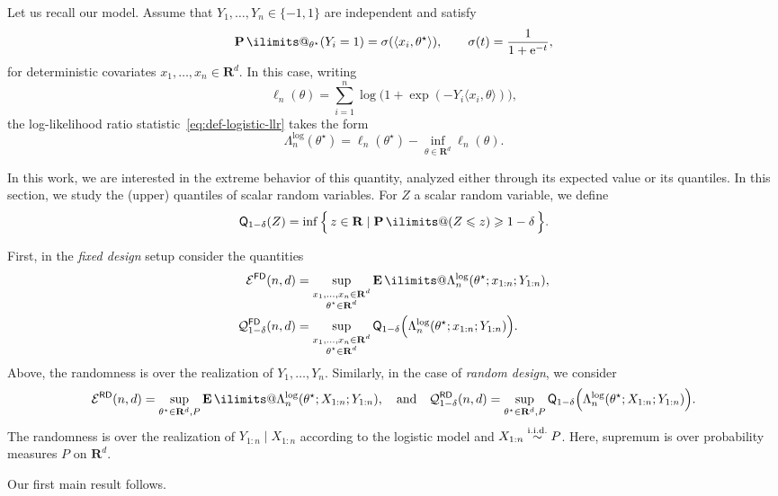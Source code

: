 \documentclass[11pt, letterpaper, hidelinks]{article}
\makeatletter
\newcommand{\R}{\mathbf R}
\newcommand{\cE}{\mathcal{E}}
\newcommand{\cQ}{\mathcal{Q}}
\newcommand{\e}{\mathrm{e}}
\newcommand{\1}{\mathbf 1}
\renewcommand{\leq}{\leqslant}
\renewcommand{\geq}{\geqslant}
\newcommand{\iid}{\textnormal{i.i.d.}}
\newcommand{\simiid}{\stackrel{\iid}{\sim}}
\newcommand{\E}{\operatorname*{\mathbf{E}}\ilimits@}
\renewcommand{\P}{\operatorname*{\mathbf{P}}\ilimits@}
\theoremstyle{plain}
\theoremstyle{definition}
\newcommand{\thetastar}{\theta^\star}
\newcommand{\defn}{=}
\newcommand{\Quant}[1]{\mathsf{Q}_{#1}}
\newcommand{\FD}{\mathsf{FD}}
\newcommand{\RD}{\mathsf{RD}}
\newcommand{\WorstCaseFixedDesign}[2]{\cE^\FD(#1,#2)}
\newcommand{\WorstCaseRandomDesign}[2]{\cE^\RD(#1,#2)}
\newcommand{\WorstCaseFixedDesignQuant}[3]{\cQ_{#1}^\FD(#2,#3)}
\newcommand{\WorstCaseRandomDesignQuant}[3]{\cQ_{#1}^\RD(#2,#3)}
\makeatother
\begin{document}
Let us recall our model. Assume that
\(Y_1,\dots,Y_n\in\{-1,1\}\) are independent and satisfy
\begin{equation}
\label{eqn:logistic-model}
\P_{\thetastar}(Y_i=1) = \sigma(\langle x_i,\thetastar\rangle),
\qquad
\sigma(t)=\frac{1}{1+\e^{-t}},
\end{equation}
for deterministic covariates $x_1,\dots,x_n \in \R^d$. In this case, writing
\[
\ell_n(\theta)
\defn
\sum_{i=1}^n \log\big(1+\exp(-Y_i\langle x_i,\theta\rangle)\big),
\]
the log-likelihood ratio statistic~\eqref{eq:def-logistic-llr} takes the form
\[
\Lambda^{\operatorname{log}}_n(\thetastar)
=
\ell_n(\thetastar)-\inf_{\theta\in\R^d}\ell_n(\theta).
\]

In this work, we are interested in the extreme behavior of this quantity, analyzed either through its expected value or its quantiles. In this section, we study the (upper) quantiles of scalar random variables. For $Z$ a scalar random variable, we define 
\[
\Quant{1-\delta}(Z) \defn \inf\Big\{\, z \in \R \mid \P(Z \leq z) \geq 1-\delta\,\Big\}.
\]


First, in the \emph{fixed design} setup consider the quantities
\[
\begin{aligned}
\WorstCaseFixedDesign{n}{d} 
&\defn 
\sup_{\substack{x_1, \dots, x_n \in \R^d \\ \thetastar \in \R^d}}
\E \Lambda_n^{\operatorname{log}}(\thetastar;x_{1:n}; Y_{1:n}), \\
\WorstCaseFixedDesignQuant{1-\delta}{n}{d}
&\defn 
\sup_{\substack{x_1, \dots, x_n \in \R^d \\ \thetastar \in \R^d}}
\Quant{1-\delta}\Big(\Lambda_n^{\operatorname{log}}(\thetastar;x_{1:n}; Y_{1:n})\Big).
\end{aligned}
\]
Above, the randomness is over the realization of $Y_1, \dots, Y_n$.
Similarly, in the case of \emph{random design}, we consider 
\[
\WorstCaseRandomDesign{n}{d} 
\defn 
\sup_{\thetastar \in \R^d, P}
\E \Lambda_n^{\operatorname{log}}(\thetastar;X_{1:n}; Y_{1:n}), 
\quad \mbox{and} \quad 
\WorstCaseRandomDesignQuant{1-\delta}{n}{d}
\defn 
\sup_{\thetastar \in \R^d, P}
\Quant{1-\delta}\Big(\Lambda_n^{\operatorname{log}}(\thetastar;X_{1:n}; Y_{1:n})\Big).
\]
The randomness is over the realization of $Y_{1:n} \mid X_{1:n}$ according 
to the logistic model and $X_{1:n} \simiid P$.
Here, supremum is over probability measures $P$ on $\R^d$. 


Our first main result follows. 
\end{document}
